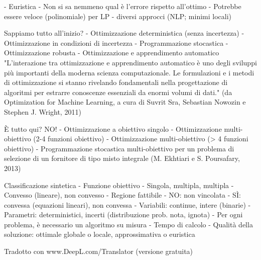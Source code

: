 \documentclass[a4paper]{extarticle}
\begin{document}
- Euristica
- Non si sa nemmeno qual è l'errore rispetto all'ottimo
- Potrebbe essere veloce (polinomiale) per LP - diversi approcci (NLP; minimi locali)

Sappiamo tutto all'inizio?
- Ottimizzazione deterministica (senza incertezza)
- Ottimizzazione in condizioni di incertezza - Programmazione stocastica
- Ottimizzazione robusta
- Ottimizzazione e apprendimento automatico
"L'interazione tra ottimizzazione e apprendimento automatico è uno degli sviluppi più importanti della moderna scienza computazionale. Le formulazioni e i metodi di ottimizzazione si stanno rivelando fondamentali nella progettazione di algoritmi per estrarre conoscenze essenziali da enormi volumi di dati."
(da Optimization for Machine Learning, a cura di Suvrit Sra, Sebastian Nowozin e Stephen J. Wright, 2011)

È tutto qui? NO!
- Ottimizzazione a obiettivo singolo
- Ottimizzazione multi-obiettivo (2-4 funzioni obiettivo)
- Ottimizzazione multi-obiettivo (> 4 funzioni obiettivo)
- Programmazione stocastica multi-obiettivo per un problema di selezione di un fornitore di tipo misto integrale (M. Ekhtiari e S. Poursafary, 2013)

Classificazione sintetica
- Funzione obiettivo
- Singola, multipla, multipla
- Convesso (lineare), non convesso
- Regione fattibile
- NO: non vincolata
- SÌ: convessa (equazioni lineari), non convessa
- Variabili: continue, intere (binarie)
- Parametri: deterministici, incerti (distribuzione prob. nota, ignota)
- Per ogni problema, è necessario un algoritmo su misura
- Tempo di calcolo
- Qualità della soluzione: ottimale globale o locale, approssimativa o euristica


Tradotto con www.DeepL.com/Translator (versione gratuita)
\end{document}
